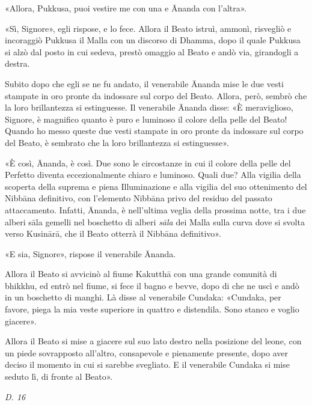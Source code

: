 «Allora, Pukkusa, puoi vestire me con una e Ānanda con l’altra».


«Sì, Signore», egli rispose, e lo fece. Allora il Beato istruì, ammonì,
risvegliò e incoraggiò Pukkusa il Malla con un discorso di Dhamma, dopo
il quale Pukkusa si alzò dal posto in cui sedeva, prestò omaggio al
Beato e andò via, girandogli a destra.


Subito dopo che egli se ne fu andato, il venerabile Ānanda mise le due
vesti stampate in oro pronte da indossare sul corpo del Beato. Allora,
però, sembrò che la loro brillantezza si estinguesse. Il venerabile
Ānanda disse: «È meraviglioso, Signore, è magnifico quanto è puro e
luminoso il colore della pelle del Beato! Quando ho messo queste due
vesti stampate in oro pronte da indossare sul corpo del Beato, è
sembrato che la loro brillantezza si estinguesse».


«È così, Ānanda, è così. Due sono le circostanze in cui il colore della
pelle del Perfetto diventa eccezionalmente chiaro e luminoso. Quali due?
Alla vigilia della scoperta della suprema e piena Illuminazione e alla
vigilia del suo ottenimento del Nibbāna definitivo, con l’elemento
Nibbāna privo del residuo del passato attaccamento. Infatti, Ānanda, è
nell’ultima veglia della prossima notte, tra i due alberi sāla gemelli
nel boschetto di alberi \emph{sāla} dei Malla sulla curva dove si svolta
verso Kusinārā, che il Beato otterrà il Nibbāna definitivo».


«E sia, Signore», rispose il venerabile Ānanda.


Allora il Beato si avvicinò al fiume Kakutthā con una grande comunità di
bhikkhu, ed entrò nel fiume, si fece il bagno e bevve, dopo di che ne
uscì e andò in un boschetto di manghi. Là disse al venerabile Cundaka:
«Cundaka, per favore, piega la mia veste superiore in quattro e
distendila. Sono stanco e voglio giacere».


Allora il Beato si mise a giacere sul suo lato destro nella posizione
del leone, con un piede sovrapposto all’altro, consapevole e pienamente
presente, dopo aver deciso il momento in cui si sarebbe svegliato. E il
venerabile Cundaka si mise seduto lì, di fronte al Beato».


\emph{D. 16}


